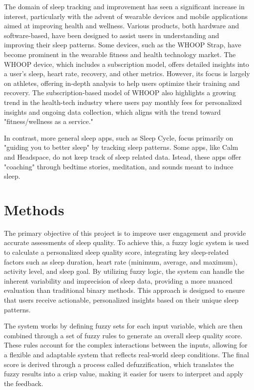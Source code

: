 \documentclass[10pt,twocolumn]{article}
\begin{document}
The domain of sleep tracking and improvement has seen a significant increase in interest, particularly with the advent of wearable devices and mobile applications aimed at improving health and wellness. Various products, both hardware and software-based, have been designed to assist users in understanding and improving their sleep patterns. Some devices, such as the WHOOP Strap\cite{digital-sleep-technologies}, have become prominent in the wearable fitness and health technology market. The WHOOP device, which includes a subscription model, offers detailed insights into a user’s sleep, heart rate, recovery, and other metrics. However, its focus is largely on athletes, offering in-depth analysis to help users optimize their training and recovery. The subscription-based model of WHOOP also highlights a growing trend in the health-tech industry where users pay monthly fees for personalized insights and ongoing data collection, which aligns with the trend toward "fitness/wellness as a service."

In contrast, more general sleep apps, such as Sleep Cycle,  focus primarily on "guiding you to better sleep"\cite{sleep-cycle-app} by tracking sleep patterns. Some apps, like Calm and Headspace, do not keep track of sleep related data. Istead, these apps offer "coaching" through bedtime stories, meditation, and sounds meant to induce sleep.


\section{Methods}
The primary objective of this project is to improve user engagement and provide accurate assessments of sleep quality. To achieve this, a fuzzy logic system is used to calculate a personalized sleep quality score, integrating key sleep-related factors such as sleep duration, heart rate (minimum, average, and maximum), activity level, and sleep goal. By utilizing fuzzy logic, the system can handle the inherent variability and imprecision of sleep data, providing a more nuanced evaluation than traditional binary methods. This approach is designed to ensure that users receive actionable, personalized insights based on their unique sleep patterns.

The system works by defining fuzzy sets\cite{mamdani-system} for each input variable, which are then combined through a set of fuzzy rules to generate an overall sleep quality score. These rules account for the complex interactions between the inputs, allowing for a flexible and adaptable system that reflects real-world sleep conditions. The final score is derived through a process called defuzzification, which translates the fuzzy results into a crisp value, making it easier for users to interpret and apply the feedback.
\end{document}
